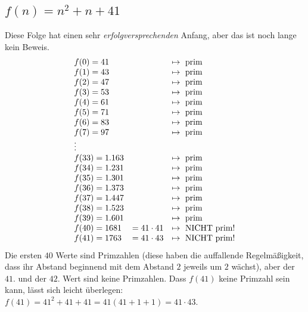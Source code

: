 \begin{refsegment}
\subsection{\texorpdfstring{$f(n) = n^2 + n + 41$}{f(n) = n\^{}2 + n + 41}}
\label{L-Polynomfunktion01-41}
   Diese Folge hat einen sehr {\em erfolgversprechenden} Anfang,
   aber das ist noch lange kein Beweis.
$$
\begin{array}{lll}
f(0) = 41 & &  \mapsto {\rm ~prim} \\
f(1) = 43 & &  \mapsto {\rm ~prim} \\
f(2) = 47 & &  \mapsto {\rm ~prim} \\
f(3) = 53 & &  \mapsto {\rm ~prim} \\
f(4) = 61 & &  \mapsto {\rm ~prim} \\
f(5) = 71 & &  \mapsto {\rm ~prim} \\
f(6) = 83 & &  \mapsto {\rm ~prim} \\
f(7) = 97 & &  \mapsto {\rm ~prim} \\
\vdots \\
f(33) = 1.163 & & \mapsto {\rm ~prim} \\
f(34) = 1.231 & & \mapsto {\rm ~prim} \\
f(35) = 1.301 & & \mapsto {\rm ~prim} \\
f(36) = 1.373 & & \mapsto {\rm ~prim} \\
f(37) = 1.447 & & \mapsto {\rm ~prim} \\
f(38) = 1.523 & & \mapsto {\rm ~prim} \\
f(39) = 1.601 & & \mapsto {\rm ~prim} \\
f(40) = 1681 & = 41 \cdot 41 &  \mapsto {\rm ~NICHT~prim}! \\
f(41) = 1763 & = 41 \cdot 43 &   \mapsto {\rm ~NICHT~prim}! \\
\end{array}
$$
        Die ersten $40$ Werte sind Primzahlen (diese haben die auffallende
        Regelmäßigkeit, dass ihr Abstand beginnend mit dem Abstand $2$
        jeweils um $2$ wächst), aber der $41$. und der $42$. Wert
        sind keine Primzahlen.
        Dass $f(41)$ keine Primzahl sein kann, lässt sich leicht überlegen:
        $f(41) = 41^2 + 41 + 41 = 41 (41 + 1 + 1) = 41 \cdot 43$.




\end{refsegment}
